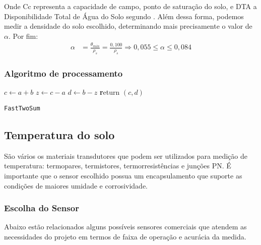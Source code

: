 		Onde Cc representa a capacidade de campo, ponto de saturação do solo, e DTA a Disponibilidade Total de Água do Solo segundo \cite{bib_sen_04_ian}. Além dessa forma, podemos medir a densidade do solo escolhido, determinando mais precisamente o valor de $\alpha$. Por fim:
		\begin{align*}
		\alpha &= \frac{\theta_{min}}{\rho_s} = \frac{0,100}{\rho_s} \Rightarrow 0,055 \leq \alpha \leq 0,084
		\end{align*}

		\subsubsection{Algoritmo de processamento}

		\begin{center}
			\begin{minipage}{0.5\linewidth} %
				\begin{algorithm}[H]
					\label{alg_ele_victor_01}
					\medskip
					$c \leftarrow a + b$ \;
					$z \leftarrow c - a$ \;
					$d \leftarrow b - z$ \;
					{\textbf return} $(c,d)$ \;
					\caption{\texttt{FastTwoSum}} %
					\label{alg:fastTwoSum}   %
				\end{algorithm}
			\end{minipage}
		\end{center}

	\subsection{Temperatura do solo}

		São vários os materiais transdutores que podem ser utilizados para medição de temperatura: termopares, termistores, termorresistências e junções PN. É importante que o sensor escolhido possua um encapsulamento que suporte as condições de maiores umidade e corrosividade.

		\subsubsection{Escolha do Sensor}

		Abaixo estão relacionados alguns possíveis sensores comerciais que atendem as necessidades do projeto em termos de faixa de operação e acurácia da medida. 


